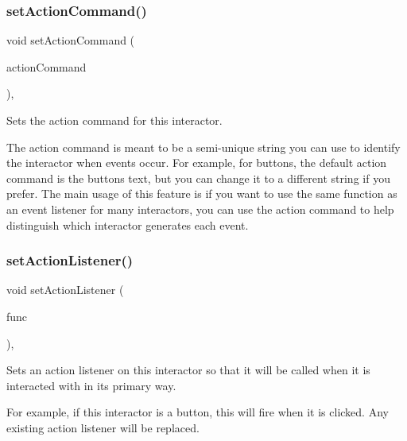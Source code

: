 \subsubsection{\texorpdfstring{set\+Action\+Command()}{setActionCommand()}}
{\footnotesize\ttfamily void set\+Action\+Command (\begin{DoxyParamCaption}\item[{const std\+::string \&}]{action\+Command }\end{DoxyParamCaption})\hspace{0.3cm}{\ttfamily [virtual]}, {\ttfamily [inherited]}}



Sets the action command for this interactor. 

The action command is meant to be a semi-\/unique string you can use to identify the interactor when events occur. For example, for buttons, the default action command is the button\textquotesingle{}s text, but you can change it to a different string if you prefer. The main usage of this feature is if you want to use the same function as an event listener for many interactors, you can use the action command to help distinguish which interactor generates each event. \mbox{\label{classsgl_1_1GInteractor_adcfb4742430c88714fcf57e57ab8ea9c}} 
\subsubsection{\texorpdfstring{set\+Action\+Listener()}{setActionListener()}\hspace{0.1cm}{\footnotesize\ttfamily [1/2]}}
{\footnotesize\ttfamily void set\+Action\+Listener (\begin{DoxyParamCaption}\item[{\mbox{\hyperlink{namespacesgl_ae9f3e9eab70035da1a2b114e21357b25}{G\+Event\+Listener}}}]{func }\end{DoxyParamCaption})\hspace{0.3cm}{\ttfamily [virtual]}, {\ttfamily [inherited]}}



Sets an action listener on this interactor so that it will be called when it is interacted with in its primary way. 

For example, if this interactor is a button, this will fire when it is clicked. Any existing action listener will be replaced. \mbox{\label{classsgl_1_1GInteractor_aebd20a89c7a8a43a6fce999cf4f9fcf2}} 

